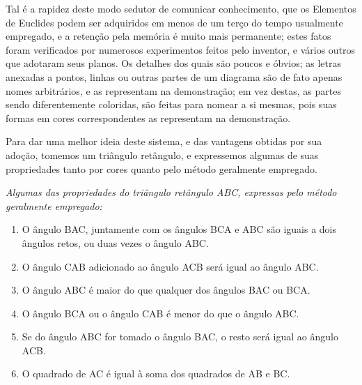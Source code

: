 \documentclass[booklanguage=brazilian]{byrnebook}
\begin{document}
Tal é a rapidez deste modo sedutor de comunicar conhecimento, que os Elementos de Euclides podem ser adquiridos em menos de um terço do tempo usualmente empregado, e a retenção pela memória é muito mais permanente; estes fatos foram verificados por numerosos experimentos feitos pelo inventor, e vários outros que adotaram seus planos. Os detalhes dos quais são poucos e óbvios; as letras anexadas a pontos, linhas ou outras partes de um diagrama são de fato apenas nomes arbitrários, e as representam na demonstração; em vez destas, as partes sendo diferentemente coloridas, são feitas para nomear a si mesmas, pois suas formas em cores correspondentes as representam na demonstração.

Para dar uma melhor ideia deste sistema, e das vantagens obtidas por sua adoção, tomemos um triângulo retângulo, e expressemos algumas de suas propriedades tanto por cores quanto pelo método geralmente empregado.


\begin{center}
\drawCurrentPictureInMargin \emph{Algumas das propriedades do triângulo retângulo ABC, expressas pelo método geralmente empregado:}
\end{center}

\baselineskip

\begin{enumerate}
\item O ângulo BAC, juntamente com os ângulos BCA e ABC são iguais a dois ângulos retos, ou duas vezes o ângulo ABC.
\item O ângulo CAB adicionado ao ângulo ACB será igual ao ângulo ABC.
\item O ângulo ABC é maior do que qualquer dos ângulos BAC ou BCA.
\item O ângulo BCA ou o ângulo CAB é menor do que o ângulo ABC.
\item Se do ângulo ABC for tomado o ângulo BAC, o resto será igual ao ângulo ACB.
\item O quadrado de AC é igual à soma dos quadrados de AB e BC.
\end{enumerate}
\end{document}
